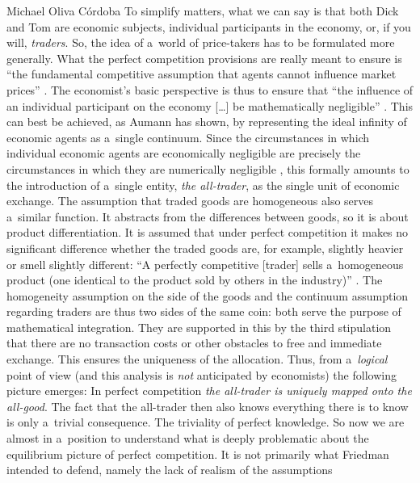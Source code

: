 \begin{artengenv}{Michael Oliva Córdoba}
\noindent To simplify matters, what we can say is that both Dick and Tom are economic subjects, individual participants in the economy, or, if you will, \textit{traders}. So, the idea of a~world of price-takers has to be formulated more generally. What the perfect competition provisions are really meant to ensure is ``the fundamental competitive assumption that agents cannot influence market prices'' 
\parencites[][p.225]{safra_strategic_1989}[cf.][]{palgrave_macmillan_perfect_2008}. %
 The economist's basic perspective is thus to ensure that ``the influence of an individual participant on the economy […] be mathematically negligible'' 
\parencite[][p.39]{aumann_markets_1964}. %
 This can best be achieved, as Aumann has shown, by representing the ideal infinity of economic agents as a~single continuum. Since the circumstances in which individual economic agents are economically negligible are precisely the circumstances in which they are numerically negligible 
\parencite[][p.332]{bryant_general_2010}, %
 this formally amounts to the introduction of a~single entity, \textit{the all-trader}, as the single unit of economic exchange. The assumption that traded goods are homogeneous also serves a~similar function. It abstracts from the differences between goods, so it is about product differentiation. It is assumed that under perfect competition it makes no significant difference whether the traded goods are, for example, slightly heavier or smell slightly different: ``A perfectly competitive [trader] sells a~homogeneous product (one identical to the product sold by others in the industry)'' 
\parencite[][p.150]{samuelson_economics_2009}. %
 The homogeneity assumption on the side of the goods and the continuum assumption regarding traders are thus two sides of the same coin: both serve the purpose of mathematical integration. They are supported in this by the third stipulation that there are no transaction costs or other obstacles to free and immediate exchange. This ensures the uniqueness of the allocation. Thus, from a~\textit{logical} point of view (and this analysis is \textit{not} anticipated by economists) the following picture emerges: In perfect competition \textit{the all-trader is uniquely mapped onto the all-good}. The fact that the all-trader then also knows everything there is to know is only a~trivial consequence. The triviality of perfect knowledge. So now we are almost in a~position to understand what is deeply problematic about the equilibrium picture of perfect competition. It is not primarily what Friedman intended to defend, namely the lack of realism of the assumptions 

\end{artengenv}
